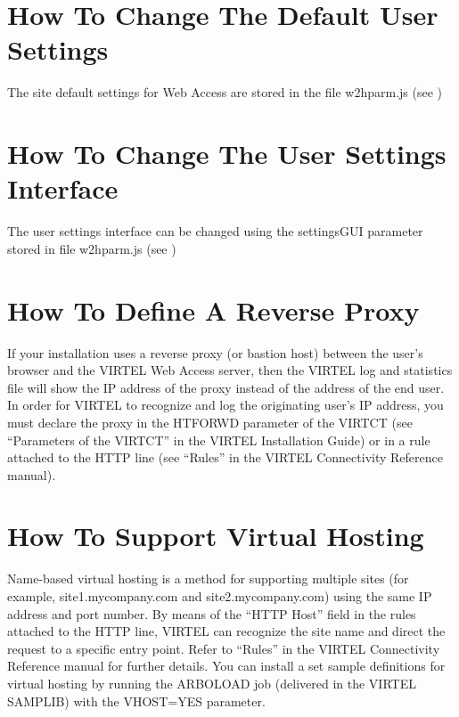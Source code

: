 \documentclass[letterpaper,10pt,english]{sphinxmanual}
\begin{document}
\section{How To Change The Default User Settings}
\label{\detokenize{User_Guide:how-to-change-the-default-user-settings}}
The site default settings for Web Access are stored in the file w2hparm.js (see {\hyperref[\detokenize{User_Guide:v457ug-global-modifications}]{}})


\section{How To Change The User Settings Interface}
\label{\detokenize{User_Guide:how-to-change-the-user-settings-interface}}
The user settings interface can be changed using the settingsGUI parameter stored in file w2hparm.js (see {\hyperref[\detokenize{User_Guide:v457ug-global-modifications}]{}})


\section{How To Define A Reverse Proxy}
\label{\detokenize{User_Guide:how-to-define-a-reverse-proxy}}
If your installation uses a reverse proxy (or bastion host) between the user’s browser and the VIRTEL Web Access
server, then the VIRTEL log and statistics file will show the IP address of the proxy instead of the address of the end
user. In order for VIRTEL to recognize and log the originating user’s IP address, you must declare the proxy in the
HTFORWD parameter of the VIRTCT (see “Parameters of the VIRTCT” in the VIRTEL Installation Guide) or in a rule
attached to the HTTP line (see “Rules” in the VIRTEL Connectivity Reference manual).


\section{How To Support Virtual Hosting}
\label{\detokenize{User_Guide:how-to-support-virtual-hosting}}
Name-based virtual hosting is a method for supporting multiple sites (for example, site1.mycompany.com and
site2.mycompany.com) using the same IP address and port number. By means of the “HTTP Host” field in the rules
attached to the HTTP line, VIRTEL can recognize the site name and direct the request to a specific entry point. Refer to
“Rules” in the VIRTEL Connectivity Reference manual for further details. You can install a set sample definitions for
virtual hosting by running the ARBOLOAD job (delivered in the VIRTEL SAMPLIB) with the VHOST=YES parameter.
\end{document}
